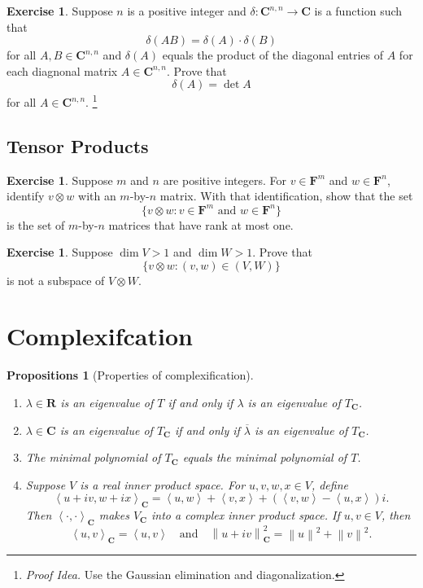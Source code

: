 \documentclass[nofonts,colorlinks]{tufte-handout}
\theoremstyle{plain} %
\newtheorem{props}[thm]{Propositions}
\theoremstyle{definition}
\newtheorem{exer}[thm]{Exercise}
\theoremstyle{remark}
\def\idea{\textit{\color[rgb]{0,0,.55}Proof Idea. }}
\newcommand{\norm}[1]{\mathopen{}\left\lVert#1\right\rVert}
\newcommand{\inp}[2]{\mathopen{}\left\langle#1,#2\right\rangle}
\newcommand{\R}{\mathbf{R}}
\newcommand{\C}{\mathbf{C}}
\newcommand{\F}{\mathbf{F}}
\begin{document}
\begin{exer}
	Suppose $n$ is a positive integer and $\delta:\C^{n,n}\to\C$ is a function such that
	\[\delta(AB)=\delta(A)\cdot\delta(B)\]
	for all $A,B\in\C^{n,n}$ and $\delta(A)$ equals the product of the diagonal entries of $A$ for each diagnonal matrix $A\in\C^{n,n}$. Prove that
	\[\delta(A)=\det A\]
	for all $A\in\C^{n,n}$.%
	\footnote{\idea Use the Gaussian elimination and diagonalization.}
\end{exer}


\subsection{Tensor Products}
\begin{exer}
	Suppose $m$ and $n$ are positive integers. For $v\in\F^m$ and $w\in\F^n$, identify $v\otimes w$ with an $m$-by-$n$ matrix. With that identification, show that the set
	\[\{v\otimes w:v\in\F^m\text{ and }w\in\F^n\}\]
	is the set of $m$-by-$n$ matrices that have rank at most one.
\end{exer}

\begin{exer}
	Suppose $\dim V>1$ and $\dim W>1$. Prove that
	\[\{v\otimes w:(v,w)\in(V,W)\}\]
	is not a subspace of $V\otimes W$.
\end{exer}


\section{Complexifcation}
\begin{props}[Properties of complexification]
	\begin{enumerate}
		\item $\lambda\in\R$ is an eigenvalue of $T$ if and only if $\lambda$ is an eigenvalue of $T_{\C}$.
		\item $\lambda\in\C$ is an eigenvalue of $T_{\C}$ if and only if $\overline{\lambda}$ is an eigenvalue of $T_{\C}$.
		\item The minimal polynomial of $T_{\C}$ equals the minimal polynomial of $T$.
		\item Suppose $V$ is a real inner product space. For $u,v,w,x\in V$, define
		\[\inp{u+iv}{w+ix}_{\C}=\inp{u}{w}+\inp{v}{x}+(\inp{v}{w}-\inp{u}{x})i.\]
		Then $\inp{\cdot}{\cdot}_{\C}$ makes $V_{\C}$ into a complex inner product space. If $u,v\in V$, then
		\[\inp{u}{v}_{\C}=\inp{u}{v}\quad\text{and}\quad\norm{u+iv}_{\C}^2=\norm{u}^2+\norm{v}^2.\]
	\end{enumerate}
\end{props}
\end{document}
